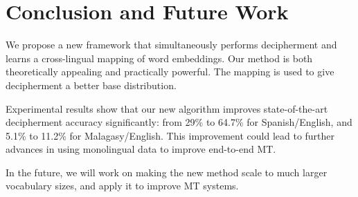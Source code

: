 \section{Conclusion and Future Work}


We propose a new framework that simultaneously performs decipherment and learns a cross-lingual mapping of word embeddings. Our method is both theoretically appealing and practically powerful. The mapping is used to give decipherment a better base distribution. 

Experimental results show that our new algorithm improves state-of-the-art decipherment accuracy significantly: from 29\% to 64.7\% for Spanish/English, and 5.1\% to 11.2\% for Malagasy/English. This improvement could lead to further advances in using monolingual data to improve end-to-end MT.

In the future, we will work on making the new method scale to much larger vocabulary sizes, and apply it to improve MT systems.